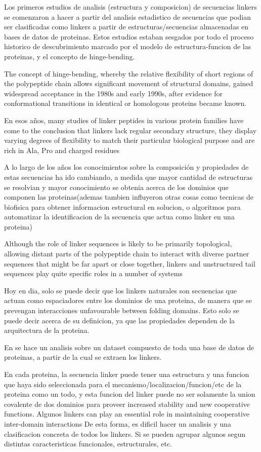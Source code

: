 Los primeros estudios de analisis (estructura y composicion) de secuencias linkers se comenzaron a hacer a partir del analisis estadistico de secuencias que podian ser clasificadas como linkers a partir de estructuras/secuencias almacenadas en bases de datos de proteinas.
Estos estudios estaban sesgados por todo el proceso historico de descubrimiento marcado por el modelo de estructura-funcion de las proteinas, y el concepto de hinge-bending.

The concept of hinge-bending, whereby the relative flexibility of short regions of the polypeptide chain allows significant movement of structural domains, gained widespread acceptance in
the 1980s and early 1990s, after evidence for conformational transitions in identical or homologous proteins became known.


En esos años, many studies of linker peptides in various protein families have come to the conclusion that linkers lack regular secondary structure, they display varying degrees of flexibility to match their particular biological purpose and are rich in Ala, Pro and charged residues

A lo largo de los años los conocimientos sobre la composición y propiedades de estas secuencias ha ido cambiando, 
a medida que mayor cantidad de estructuras se resolvian y mayor conocimiento se obtenia acerca de los dominios que componen las proteinas(ademas tambien influyeron otras cosas como tecnicas de biofisica para obtener informacion estructural en solucion, o algoritmos para automatizar la identificacion de la secuencia que actua como linker en una proteina)

Although the role of linker sequences is likely to be primarily topological, allowing distant parts of the polypeptide chain to interact with diverse partner sequences that might be far apart or close together, linkers and unstructured tail sequences play quite specific roles in a
number of systems

Hoy en dia, solo se puede decir que los linkers naturales son secuencias que actuan como espaciadores entre los dominios de una proteina, de manera que se prevengan interacciones unfavourable between folding domains. 
Esto solo se puede decir acerca de su definicion, ya que las propiedades dependen de la arquitectura de la proteina.

En \cite{george2002analysis} se hace un analisis sobre un dataset compuesto de toda una base de datos de proteinas, a partir de la cual se extraen los linkers.


En cada proteina, la secuencia linker puede tener una estructura y una funcion que haya sido seleccionada para el mecanismo/localizacion/funcion/etc de la proteina como un todo, y esta funcion del linker puede no ser solamente la union covalente de dos dominios para proveer increased stability and new cooperative functions.
Algunos linkers can play an essential role in maintaining cooperative inter-domain interactions
De esta forma, es dificil hacer un analisis y una clasificacion concreta de todos los linkers. Si se pueden agrupar algunos segun distintas caracteristicas funcionales, estructurales, etc.




